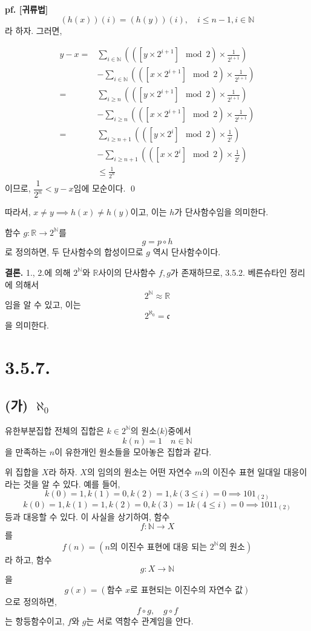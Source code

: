 \documentclass{article}
\begin{document}
\textbf{pf. [귀류법]} $$(h(x))(i) = (h(y))(i), \quad i \le n-1, i \in \mathbb{N} $$라 하자. 
그러면, 

\begin{align*}
y-x =& \sum_{i\in\mathbb{N}}{ \left(([y \times 2^{i+1}] \mod 2) \times \frac{1}{2^{i+1}} \right)}
\\ &- \sum_{i\in\mathbb{N}}{ \left(([x \times 2^{i+1}] \mod 2) \times \frac{1}{2^{i+1}} \right)} 
\\ =& \sum_{i \ge n}{ \left(([y \times 2^{i+1}] \mod 2) \times \frac{1}{2^{i+1}} \right)}
\\ &- \sum_{i \ge n}{ \left(([x \times 2^{i+1}] \mod 2) \times \frac{1}{2^{i+1}} \right)} 
\\ =& \sum_{i \ge n+1}{ \left(([y \times 2^i] \mod 2) \times \frac{1}{2^i} \right)}
\\ &- \sum_{i \ge n+1}{ \left(([x \times 2^i] \mod 2) \times \frac{1}{2^i} \right)} 
\\ &\le \frac{1}{2^n}
\end{align*}
이므로, $\dfrac{1}{2^n}< y-x$임에 모순이다. \qed

따라서, $x \neq y \implies h(x) \neq h(y)$이고, 이는 $h$가 단사함수임을 의미한다.

함수 $g : \mathbb{R} \rightarrow 2^{\mathbb{N}}$를 $$g = p \circ h$$로 정의하면, 두 단사함수의 합성이므로 $g$ 역시 단사함수이다.

\textbf{결론.} 1., 2.에 의해 $2^{\mathbb{N}}$와 $\mathbb{R}$사이의 단사함수 $f, g$가 존재하므로, 3.5.2. 베른슈타인 정리에 의해서 
$$2^{\mathbb{N}} \approx \mathbb{R}$$
임을 알 수 있고, 이는 
$$2^{\aleph_0} = \mathfrak{c} $$
을 의미한다.


\section{3.5.7.}
\subsection{(가) $\aleph_0$}
유한부분집합 전체의 집합은 $k \in 2^\mathbb{N}$의 원소($k$)중에서
$$k(n) = 1 \quad n \in \mathbb{N}$$을 만족하는 $n$이 유한개인 원소들을 모아놓은 집합과 같다.

위 집합을 $X$라 하자. $X$의 임의의 원소는 어떤 자연수 $m$의 이진수 표현 일대일 대응이라는 것을 알 수 있다. 예를 들어,
$$k(0) = 1, k(1) = 0, k(2) = 1, k(3 \le i) = 0 \implies 101_{(2)}$$
$$k(0) = 1, k(1) = 1, k(2) = 0, k(3) = 1 k(4 \le i) = 0 \implies 1011_{(2)}$$
등과 대응할 수 있다. 이 사실을 상기하여, 함수
$$f : \mathbb{N} \rightarrow X$$
를 $$f(n) = (\text{$n$의 이진수 표현에 대응 되는 $2^\mathbb{N}$의 원소})$$
라 하고, 함수
$$g : X \rightarrow \mathbb{N}$$을
$$g(x) = (\text{함수 $x$로 표현되는 이진수의 자연수 값})$$으로 정의하면,
$$f \circ g, \quad g \circ f$$는 항등함수이고, $f$와 $g$는 서로 역함수 관계임을 안다.
\end{document}
